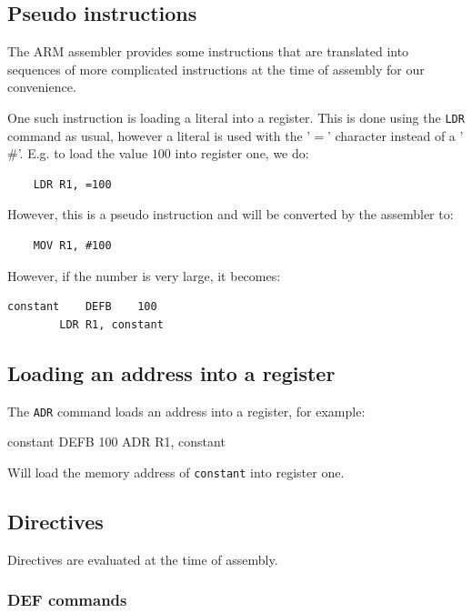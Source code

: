 \subsection{Pseudo instructions}

The ARM assembler provides some instructions that are translated into sequences of more complicated instructions at the time of assembly for our convenience.

One such instruction is loading a literal into a register. This is done using the {\tt LDR} command as usual, however a literal is used with the '$=$' character instead of a '$\#$'. E.g. to load the value $100$ into register one, we do:

\begin{verbatim}
	LDR	R1,	=100
\end{verbatim}

However, this is a pseudo instruction and will be converted by the assembler to:

\begin{verbatim}
	MOV	R1,	#100
\end{verbatim}

However, if the number is very large, it becomes:

\begin{verbatim}
constant	DEFB	100
		LDR	R1, constant
\end{verbatim}

\subsection{Loading an address into a register}

The {\tt ADR} command loads an address into a register, for example:

\begin{listing}{1}
constant	DEFB	100
		ADR	R1, constant
\end{listing}

Will load the memory address of {\tt constant} into register one.

\subsection{Directives}
Directives are evaluated at the time of assembly.

\subsubsection{DEF commands}

